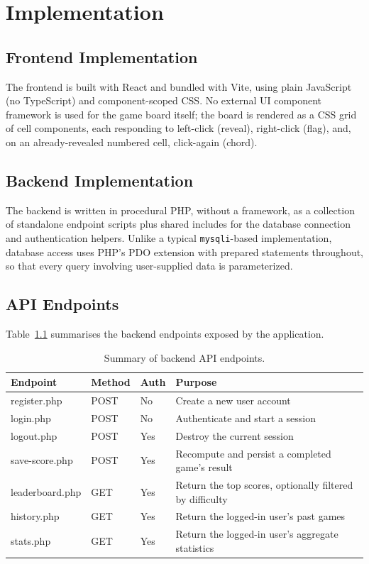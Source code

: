 \chapter{Implementation}
\label{ch:implementation}

\section{Frontend Implementation}
The frontend is built with React and bundled with Vite, using plain
JavaScript (no TypeScript) and component-scoped CSS. No external UI
component framework is used for the game board itself; the board is
rendered as a CSS grid of cell components, each responding to left-click
(reveal), right-click (flag), and, on an already-revealed numbered cell,
click-again (chord).

\section{Backend Implementation}
The backend is written in procedural PHP, without a framework, as a
collection of standalone endpoint scripts plus shared includes for the
database connection and authentication helpers. Unlike a typical
\texttt{mysqli}-based implementation, database access uses PHP's PDO
extension with prepared statements throughout, so that every query
involving user-supplied data is parameterized.

\section{API Endpoints}
Table~\ref{tab:api-endpoints} summarises the backend endpoints exposed by
the application.

\begin{table}[h]
\centering
\caption{Summary of backend API endpoints.}
\label{tab:api-endpoints}
\begin{tabular}{@{}p{3.4cm}p{1.6cm}p{1.8cm}p{6.5cm}@{}}
\toprule
\textbf{Endpoint} & \textbf{Method} & \textbf{Auth} & \textbf{Purpose} \\
\midrule
register.php & POST & No & Create a new user account \\
login.php & POST & No & Authenticate and start a session \\
logout.php & POST & Yes & Destroy the current session \\
save-score.php & POST & Yes & Recompute and persist a completed game's result \\
leaderboard.php & GET & Yes & Return the top scores, optionally filtered by difficulty \\
history.php & GET & Yes & Return the logged-in user's past games \\
stats.php & GET & Yes & Return the logged-in user's aggregate statistics \\
\bottomrule
\end{tabular}
\end{table}

